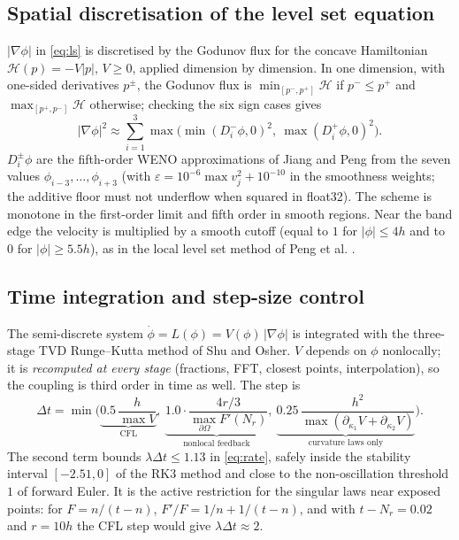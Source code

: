 \documentclass[11pt]{article}
\newcommand{\N}{N_r}
\begin{document}
\subsection{Spatial discretisation of the level set equation}

$|\nabla\phi|$ in \eqref{eq:ls} is discretised by the Godunov flux for the concave Hamiltonian
$\mathcal H(p)=-V|p|$, $V\ge0$, applied dimension by dimension. In one dimension, with one-sided
derivatives $p^\pm$, the Godunov flux is $\min_{[p^-,p^+]}\mathcal H$ if $p^-\le p^+$ and
$\max_{[p^+,p^-]}\mathcal H$ otherwise; checking the six sign cases gives
\begin{equation}\label{eq:godunov}
|\nabla\phi|^2\approx\sum_{i=1}^3\max\big(\min(D_i^-\phi,0)^2,\ \max(D_i^+\phi,0)^2\big).
\end{equation}
$D^\pm_i\phi$ are the fifth-order WENO approximations of Jiang and Peng \cite{jiangpeng} from the seven
values $\phi_{i-3},\dots,\phi_{i+3}$ (with $\varepsilon=10^{-6}\max v_j^2+10^{-10}$ in the smoothness
weights; the additive floor must not underflow when squared in float32). The scheme is monotone in the
first-order limit and fifth order in smooth regions. Near the band edge the velocity is multiplied by a
smooth cutoff (equal to $1$ for $|\phi|\le4h$ and to $0$ for $|\phi|\ge5.5h$), as in the local level set
method of Peng et al. \cite{peng}.

\subsection{Time integration and step-size control}\label{sec:time}

The semi-discrete system $\dot\phi=L(\phi)=V(\phi)\,|\nabla\phi|$ is integrated with the three-stage TVD
Runge--Kutta method of Shu and Osher. $V$ depends on $\phi$ nonlocally; it is \emph{recomputed at every
stage} (fractions, FFT, closest points, interpolation), so the coupling is third order in time as well.
The step is
\begin{equation}\label{eq:dt}
\Delta t=\min\Big(\underbrace{0.5\,\frac{h}{\max V}}_{\text{CFL}},\ \underbrace{1.0\cdot\frac{4r/3}{\max_{\partial\Omega}F'(\N)}}_{\text{nonlocal feedback}},\ \underbrace{0.25\,\frac{h^2}{\max(\partial_{\kappa_1}V+\partial_{\kappa_2}V)}}_{\text{curvature laws only}}\Big).
\end{equation}
The second term bounds $\lambda\Delta t\le1.13$ in \eqref{eq:rate}, safely inside the stability interval
$[-2.51,0]$ of the RK3 method and close to the non-oscillation threshold $1$ of forward Euler. It is the
active restriction for the singular laws near exposed points: for $F=n/(t-n)$, $F'/F=1/n+1/(t-n)$, and with
$t-\N=0.02$ and $r=10h$ the CFL step would give $\lambda\Delta t\approx2$.
\end{document}
